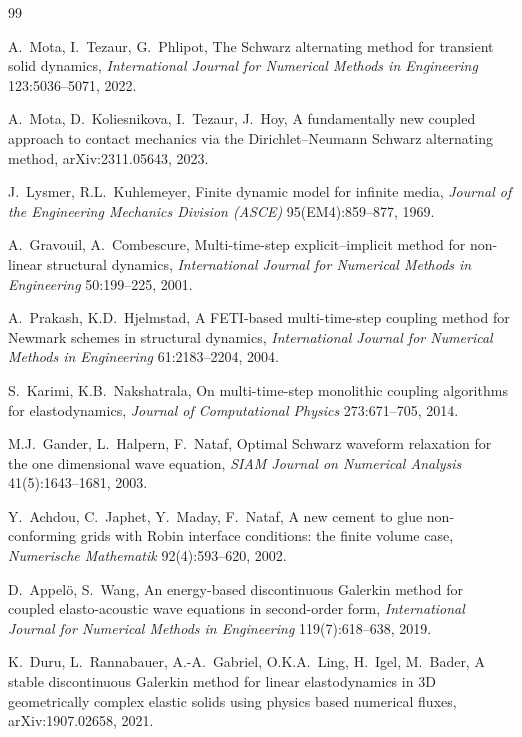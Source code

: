 \documentclass[11pt]{article}
\begin{document}
\begin{thebibliography}{99}

A.~Mota, I.~Tezaur, G.~Phlipot,
The Schwarz alternating method for transient solid dynamics,
\emph{International Journal for Numerical Methods in Engineering}
123:5036--5071, 2022.

A.~Mota, D.~Koliesnikova, I.~Tezaur, J.~Hoy,
A fundamentally new coupled approach to contact mechanics via the
Dirichlet--Neumann Schwarz alternating method,
arXiv:2311.05643, 2023.

J.~Lysmer, R.L.~Kuhlemeyer,
Finite dynamic model for infinite media,
\emph{Journal of the Engineering Mechanics Division (ASCE)}
95(EM4):859--877, 1969.

A.~Gravouil, A.~Combescure,
Multi-time-step explicit--implicit method for non-linear structural
dynamics,
\emph{International Journal for Numerical Methods in Engineering}
50:199--225, 2001.

A.~Prakash, K.D.~Hjelmstad,
A FETI-based multi-time-step coupling method for Newmark schemes in
structural dynamics,
\emph{International Journal for Numerical Methods in Engineering}
61:2183--2204, 2004.

S.~Karimi, K.B.~Nakshatrala,
On multi-time-step monolithic coupling algorithms for elastodynamics,
\emph{Journal of Computational Physics} 273:671--705, 2014.

M.J.~Gander, L.~Halpern, F.~Nataf,
Optimal Schwarz waveform relaxation for the one dimensional wave equation,
\emph{SIAM Journal on Numerical Analysis} 41(5):1643--1681, 2003.

Y.~Achdou, C.~Japhet, Y.~Maday, F.~Nataf,
A new cement to glue non-conforming grids with Robin interface conditions:
the finite volume case,
\emph{Numerische Mathematik} 92(4):593--620, 2002.

D.~Appel\"o, S.~Wang,
An energy-based discontinuous Galerkin method for coupled elasto-acoustic
wave equations in second-order form,
\emph{International Journal for Numerical Methods in Engineering}
119(7):618--638, 2019.

K.~Duru, L.~Rannabauer, A.-A.~Gabriel, O.K.A.~Ling, H.~Igel, M.~Bader,
A stable discontinuous Galerkin method for linear elastodynamics in 3D
geometrically complex elastic solids using physics based numerical fluxes,
arXiv:1907.02658, 2021.


\end{thebibliography}
\end{document}
